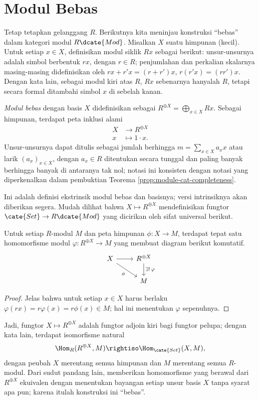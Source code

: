 \section{Modul Bebas}\label{sec:free-modules}
Tetap tetapkan gelanggang $R$. Berikutnya kita meninjau konstruksi ``bebas'' dalam kategori modul $R\dcate{Mod}$. Misalkan $X$ suatu himpunan (kecil). Untuk setiap $x \in X$, definisikan modul siklik $Rx$ sebagai berikut: unsur-unsurnya adalah simbol berbentuk $rx$, dengan $r \in R$; penjumlahan dan perkalian skalarnya masing-masing didefinisikan oleh $rx + r'x = (r+r')x$, $r(r'x) = (rr')x$. Dengan kata lain, sebagai modul kiri atas $R$, $Rx$ sebenarnya hanyalah $R$, tetapi secara formal ditambahi simbol $x$ di sebelah kanan.
\begin{definition}\label{def:free-module}
	\emph{Modul bebas} dengan basis $X$ didefinisikan sebagai $R^{\oplus X} = \bigoplus_{x \in X} Rx$. Sebagai himpunan, terdapat peta inklusi alami
	\begin{align*}
		X & \longrightarrow R^{\oplus X} \\
		x & \longmapsto 1 \cdot x.
	\end{align*}
	Unsur-unsurnya dapat ditulis sebagai jumlah berhingga $m = \sum_{x \in X} a_x x$ atau larik $(a_x)_{x \in X}$, dengan $a_x \in R$ ditentukan secara tunggal dan paling banyak berhingga banyak di antaranya tak nol; notasi ini konsisten dengan notasi yang diperkenalkan dalam pembuktian Teorema \ref{prop:module-cat-completeness}.
\end{definition}
Ini adalah definisi ekstrinsik modul bebas dan basisnya; versi intrinsiknya akan diberikan segera. Mudah dilihat bahwa $X \mapsto R^{\oplus X}$ mendefinisikan fungtor $\cate{Set} \to R\dcate{Mod}$ yang dicirikan oleh sifat universal berikut.

\begin{proposition}\label{prop:free-module-property}
	Untuk setiap $R$-modul $M$ dan peta himpunan $\phi: X \to M$, terdapat tepat satu homomorfisme modul $\varphi: R^{\oplus X} \to M$ yang membuat diagram berikut komutatif.
	\[ \begin{tikzcd}
		X \arrow[rd, "\phi"'] \arrow[r] & R^{\oplus X} \arrow[d, "{\exists! \, \varphi}"] \\
		& M
	\end{tikzcd} \]
\end{proposition}
\begin{proof}
	Jelas bahwa untuk setiap $x \in X$ harus berlaku $\varphi(rx) = r\varphi(x) = r\phi(x) \in M$; hal ini menentukan $\varphi$ sepenuhnya.
\end{proof}
Jadi, fungtor $X \mapsto R^{\oplus X}$ adalah fungtor adjoin kiri bagi fungtor pelupa; dengan kata lain, terdapat isomorfisme natural
\[ \Hom_R(R^{\oplus X}, M) \rightiso \Hom_\cate{Set}(X, M), \]
dengan peubah $X$ merentang semua himpunan dan $M$ merentang semua $R$-modul. Dari sudut pandang lain, memberikan homomorfisme yang berawal dari $R^{\oplus X}$ ekuivalen dengan menentukan bayangan setiap unsur basis $X$ tanpa syarat apa pun; karena itulah konstruksi ini ``bebas''.

